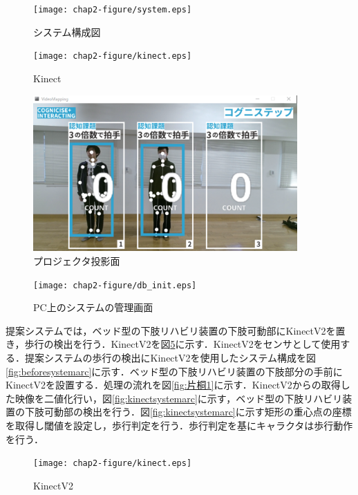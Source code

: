 \begin{figure}[tbp]
	\centering
			\texttt{[image: chap2-figure/system.eps]}
	\caption{システム構成図}
	\label{fig:system}
\end{figure}

\begin{figure}[tbp]
	\centering
			\texttt{[image: chap2-figure/kinect.eps]}
	\caption{Kinect}
	\label{fig:kinect}
\end{figure}
\fi

\begin{figure}[tbp]
	\centering
			\includegraphics[width=0.9\textwidth]{chap2-figure/vm_init.eps}
	\caption{プロジェクタ投影面}
	\label{fig:vm_init}
\end{figure}

\begin{figure}[tbp]
	\centering
			\texttt{[image: chap2-figure/db\_init.eps]}
	\caption{PC上のシステムの管理画面}
	\label{fig:db_init}
\end{figure}


提案システムでは，ベッド型の下肢リハビリ装置の下肢可動部にKinectV2\cite{KinectV2}を置き，歩行の検出を行う．KinectV2を図\ref{fig:kinect}に示す．KinectV2をセンサとして使用する．提案システムの歩行の検出にKinectV2を使用したシステム構成を図\ref{fig:beforesystemarc}に示す．ベッド型の下肢リハビリ装置の下肢部分の手前にKinectV2を設置する．処理の流れを図\ref{fig:片桐1}に示す．KinectV2からの取得した映像を二値化行い，図\ref{fig:kinectsystemarc}に示す，ベッド型の下肢リハビリ装置の下肢可動部の検出を行う．図\ref{fig:kinectsystemarc}に示す矩形の重心点の座標を取得し閾値を設定し，歩行判定を行う．歩行判定を基にキャラクタは歩行動作を行う．

\begin{figure}[tbp]
	\centering
			\texttt{[image: chap2-figure/kinect.eps]}
	\caption{KinectV2}
	\label{fig:kinect}
\end{figure}

